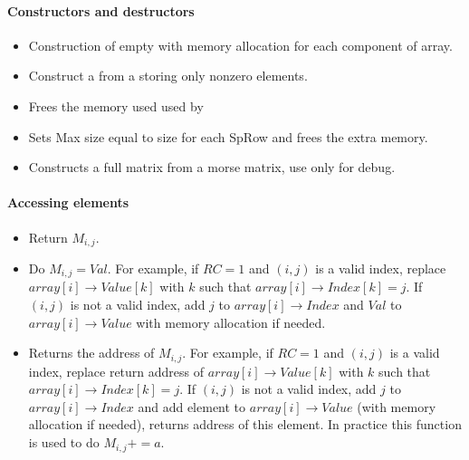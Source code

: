 \paragraph{Constructors and destructors}
\begin{itemize}
\item {}
  \sshortdescribe Construction of empty  with memory
  allocation for each component of array. 
\item
  \sshortdescribe Construct a  from  a  storing only nonzero elements.

\item {}
  \sshortdescribe Frees the memory used used by 

\item {}
  \sshortdescribe Sets Max size equal to size for each SpRow and frees the extra
  memory.

\item {}
  \sshortdescribe Constructs a full matrix from a morse matrix, use only for debug.
\end{itemize}


\paragraph{Accessing elements}
\begin{itemize}
\item {}
  \sshortdescribe Return $M_{i, j}$. 
\item {}
  \sshortdescribe Do $M_{i, j} = Val$. For example, if $RC=1$ and $(i, j)$ is a valid index, replace
  $array[i]\rightarrow Value[k]$ with $k$ such that $array[i]\rightarrow Index[k]=j$.
  If $(i, j)$ is not a valid index, add $j$ to $array[i]\rightarrow Index$ and $Val$ to
  $array[i] \rightarrow Value$ with memory allocation if needed. 
\item {}
  \sshortdescribe Returns the address of $M_{i, j}$. For example, 
  if $RC=1$ and $(i, j)$ is a valid index, replace return address of
  $array[i]\rightarrow Value[k]$ with $k$ such that $array[i]\rightarrow
  Index[k]=j$.  If $(i, j)$ is not a valid index, add $j$ to
  $array[i]\rightarrow Index$ and add element to $array[i] \rightarrow Value$
  (with memory allocation if needed), returns address of this element. In
  practice this function is used to do $M_{i, j} += a$.
\end{itemize}

